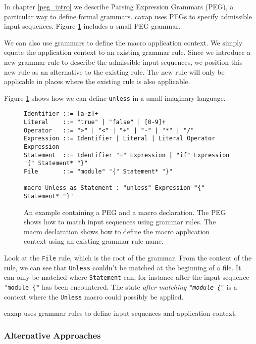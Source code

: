 In chapter \ref{peg_intro} we describe Parsing Expression Grammars (PEG), a
particular way to define formal grammars. caxap uses PEGs to specify admissible
input sequences. Figure \ref{matching_input_example} includes a small PEG
grammar.

We can also use grammars to define the macro application context. We simply
equate the application context to an existing grammar rule. Since we introduce a
new grammar rule to describe the admissible input sequences, we position this
new rule as an alternative to the existing rule. The new rule will only be
applicable in places where the existing rule is also applicable.

Figure \ref{matching_input_example} shows how we can define \texttt{unless} in a
small imaginary language.

\begin{figure}[here]
\small
\begin{lstlisting}[frame=single]
Identifier ::= [a-z]+
Literal    ::= "true" | "false" | [0-9]+
Operator   ::= ">" | "<" | "+" | "-" | "*" | "/"
Expression ::= Identifier | Literal | Literal Operator Expression
Statement  ::= Identifier "=" Expression | "if" Expression "{" Statement* "}"
File       ::= "module" "{" Statement* "}"

macro Unless as Statement : "unless" Expression "{" Statement* "}"
\end{lstlisting}
\caption{An example containing a PEG and a macro declaration. The PEG shows how
  to match input sequences using grammar rules. The macro declaration shows how
  to define the macro application context using an existing grammar rule name.}
\label{matching_input_example}
\end{figure}

Look at the \texttt{File} rule, which is the root of the grammar. From the
content of the rule, we can see that \texttt{Unless} couldn't be matched at the
beginning of a file. It can only be matched where \texttt{Statement} can, for
instance after the input sequence \texttt{"module \{"} has been encountered. The
state \emph{after matching \texttt{"module \{"}} is a context where the
\texttt{Unless} macro could possibly be applied.

caxap uses grammar rules to define input sequences and application context.

\subsubsection{Alternative Approaches}

